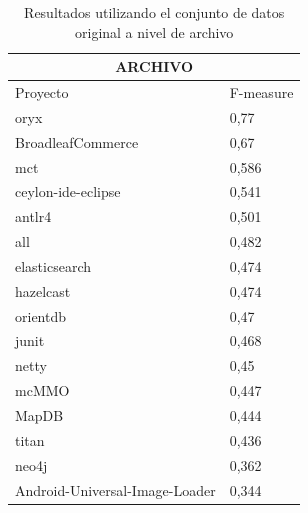 \begin{table}[H]
\captionsetup{labelsep=period, labelfont=bf}
\caption{\label{table:original_result_weka_file_result} Resultados utilizando el conjunto de datos original a nivel de archivo}
\centering
{
\fontsize{12pt}{10pt}\selectfont
\begin{tabular}{ll}
\toprule 
\multicolumn{2}{c}{ARCHIVO} \\
\midrule 
Proyecto                        & F-measure \\
\hline 
oryx                           & 0,77      \\
BroadleafCommerce              & 0,67      \\
mct                            & 0,586     \\
ceylon-ide-eclipse             & 0,541     \\
antlr4                         & 0,501     \\
all                            & 0,482     \\
elasticsearch                  & 0,474     \\
hazelcast                      & 0,474     \\
orientdb                       & 0,47      \\
junit                          & 0,468     \\
netty                          & 0,45      \\
mcMMO                          & 0,447     \\
MapDB                          & 0,444     \\
titan                          & 0,436     \\
neo4j                          & 0,362     \\
Android-Universal-Image-Loader & 0,344    \\
\bottomrule
\end{tabular}
}

\end{table}
